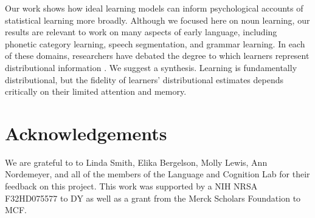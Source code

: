 \documentclass[man,floatsintext]{apa6}
\begin{document}
Our work shows how ideal learning models can inform psychological accounts of statistical learning more broadly. Although we focused here on noun learning, our results are relevant to work on many aspects of early language, including phonetic category learning, speech segmentation, and grammar learning. In each of these domains, researchers have debated the degree to which learners represent distributional information \cite{Endress2005, Frank2010a, McMurray2013}. We suggest a synthesis. Learning is fundamentally distributional, but the fidelity of learners' distributional estimates depends critically on their limited attention and memory.
%
%

\section{Acknowledgements}


We are grateful to to Linda Smith, Elika Bergelson, Molly Lewis, Ann Nordemeyer, and all of the members of the Language and Cognition Lab for their feedback on this project. This work was supported by a NIH NRSA F32HD075577 to DY as well as a grant from the Merck Scholars Foundation to MCF.



\end{document}
